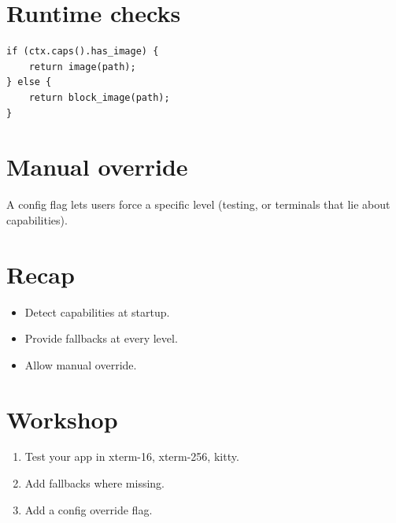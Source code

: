\section{Runtime checks}

\begin{lstlisting}
if (ctx.caps().has_image) {
    return image(path);
} else {
    return block_image(path);
}
\end{lstlisting}

\section{Manual override}

A config flag lets users force a specific level (testing,
or terminals that lie about capabilities).

\section{Recap}

\begin{recap}
\begin{itemize}[leftmargin=*]
  \item Detect capabilities at startup.
  \item Provide fallbacks at every level.
  \item Allow manual override.
\end{itemize}
\end{recap}

\section*{Workshop}

\begin{enumerate}[leftmargin=*]
  \item Test your app in xterm-16, xterm-256, kitty.
  \item Add fallbacks where missing.
  \item Add a config override flag.
\end{enumerate}

